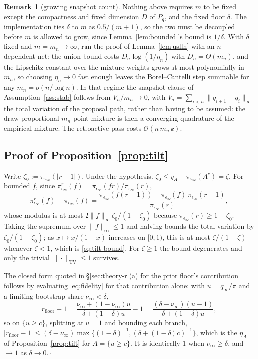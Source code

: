 \documentclass[10pt]{article}
\theoremstyle{plain}
\theoremstyle{definition}
\newtheorem{remark}{Remark}
\begin{document}
\begin{remark}[growing snapshot count]\label{rem:growing-m}
Nothing above requires $m$ to be fixed except the compactness and fixed dimension $D$ of $P_q$, and the fixed floor $\delta$. The implementation ties $\delta$ to $m$ as $0.5/(m{+}1)$, so the two must be decoupled before $m$ is allowed to grow, since Lemma~\ref{lem:bounded}'s bound is $1/\delta$. With $\delta$ fixed and $m=m_n\to\infty$, run the proof of Lemma~\ref{lem:uslln} with an $n$-dependent net: the union bound costs $D_n\log(1/\eta_n)$ with $D_n=\Theta(m_n)$, and the Lipschitz constant over the mixture weights grows at most polynomially in $m_n$, so choosing $\eta_n\to0$ fast enough leaves the Borel--Cantelli step summable for any $m_n=o(n/\log n)$. In that regime the snapshot clause of Assumption~\ref{ass:stab} follows from $V_n/m_n\to0$, with $V_n=\sum_{i<n}\|q_{i+1}-q_i\|_\infty$ the total variation of the proposal path, rather than having to be assumed: the draw-proportional $m_n$-point mixture is then a converging quadrature of the empirical mixture. The retroactive pass costs $\mathcal{O}(n\,m_n\,k)$.
\end{remark}

\subsection{Proof of Proposition~\ref{prop:tilt}}\label{app:theory-tilt}
Write $\zeta_0:=\pi_{\epsilon_\infty}(|r-1|)$. Under the hypothesis, $\zeta_0\le\eta_A+\pi_{\epsilon_\infty}(A^c)=\zeta$. For bounded $f$, since $\pi^r_{\epsilon_\infty}(f)=\pi_{\epsilon_\infty}(fr)/\pi_{\epsilon_\infty}(r)$,
\[
\pi^r_{\epsilon_\infty}(f)-\pi_{\epsilon_\infty}(f)
=\frac{\pi_{\epsilon_\infty}\!\left(f(r-1)\right)-\pi_{\epsilon_\infty}(f)\,\pi_{\epsilon_\infty}(r-1)}{\pi_{\epsilon_\infty}(r)},
\]
whose modulus is at most $2\|f\|_\infty\zeta_0/(1-\zeta_0)$ because $\pi_{\epsilon_\infty}(r)\ge1-\zeta_0$. Taking the supremum over $\|f\|_\infty\le1$ and halving bounds the total variation by $\zeta_0/(1-\zeta_0)$; as $x\mapsto x/(1-x)$ increases on $[0,1)$, this is at most $\zeta/(1-\zeta)$ whenever $\zeta<1$, which is \eqref{eq:tilt-bound}. For $\zeta\ge1$ the bound degenerates and only the trivial $\|\cdot\|_{\mathrm{TV}}\le1$ survives.

The closed form quoted in \S\ref{sec:theory-r}(a) for the prior floor's contribution follows by evaluating \eqref{eq:fidelity} for that contribution alone: with $u=q_\infty/\pi$ and a limiting bootstrap share $\nu_\infty<\delta$,
\[
r_{\mathrm{floor}}-1=\frac{\nu_\infty+(1-\nu_\infty)u}{\delta+(1-\delta)u}-1=\frac{(\delta-\nu_\infty)(u-1)}{\delta+(1-\delta)u},
\]
so on $\{u\ge c\}$, splitting at $u=1$ and bounding each branch, $|r_{\mathrm{floor}}-1|\le(\delta-\nu_\infty)\max\{(1-\delta)^{-1},(\delta+(1-\delta)c)^{-1}\}$, which is the $\eta_A$ of Proposition~\ref{prop:tilt} for $A=\{u\ge c\}$. It is identically $1$ when $\nu_\infty\ge\delta$, and $\to1$ as $\delta\to0$.\hfill$\square$
\end{document}
